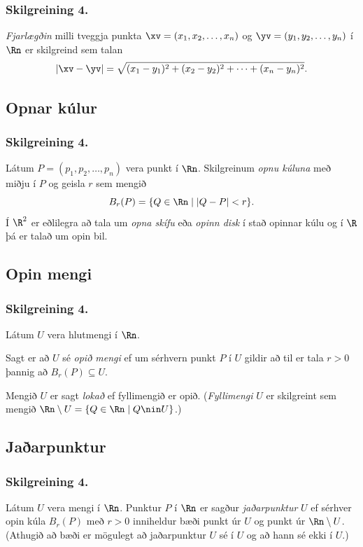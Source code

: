 \subsubsection{Skilgreining 4.}
 {\em Fjarlægðin} milli tveggja punkta 
$\xv=(x_1,x_2, \ldots,x_n)$ og $\yv=(y_1,y_2, \ldots,y_n)$ í $\Rn$ er skilgreind sem talan
$$|\xv-\yv|=\sqrt{(x_1-y_1)^2+(x_2-y_2)^2+\cdots+(x_n-y_n)^2}.$$
 



\subsection{Opnar kúlur}
 \subsubsection{Skilgreining 4.}
  Látum $P=(p_1,p_2,\ldots,p_n)$ vera punkt í
$\Rn$.  Skilgreinum {\em opnu kúluna} með miðju í $P$ og geisla $r$ sem
mengið  
$$B_r(P)=\{Q\in\Rn\mid |Q-P|<r\}.$$
Í $\R^2$ er eðlilegra að tala um {\em opna skífu} eða {\em opinn disk} í stað opinnar kúlu og í $\R$ þá er talað um opin bil.  

 




\subsection{Opin mengi}
 \subsubsection{Skilgreining 4.}
Látum $U$ vera hlutmengi í $\Rn$.

Sagt er að $U$ sé {\em opið mengi} ef um sérhvern punkt $P$ í $U$ gildir að til er tala $r>0$ þannig að $B_r(P)\subseteq U$.

Mengið $U$ er sagt {\em lokað} ef fyllimengið er opið.  ({\em Fyllimengi} $U$ er skilgreint sem mengið 
$\Rn\setminus U=\{Q\in \Rn\mid Q\nin U\}$.)




\subsection{Jaðarpunktur}
 \subsubsection{Skilgreining 4.}
Látum $U$ vera mengi í $\Rn$.  Punktur $P$ í $\Rn$ er sagður {\em jaðarpunktur} $U$ ef sérhver opin kúla $B_r(P)$ með $r>0$ inniheldur bæði punkt úr $U$ og punkt úr $\Rn\setminus U$.   (Athugið að bæði er mögulegt að jaðarpunktur $U$ sé í $U$ og að hann sé ekki í $U$.)



